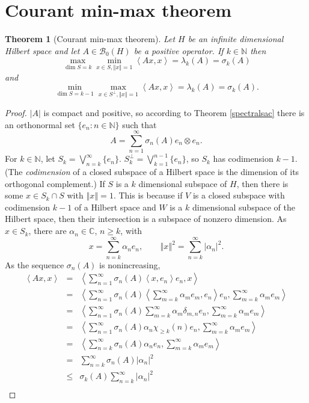 \documentclass{article}
\newcommand{\inner}[2]{\left\langle #1, #2 \right\rangle}
\newcommand{\norm}[1]{\left\Vert #1 \right\Vert}
\newtheorem{theorem}{Theorem}
\theoremstyle{definition}
\begin{document}
\section{Courant min-max theorem}
\begin{theorem}[Courant min-max theorem]
Let $H$ be an infinite dimensional Hilbert space and let $A \in \mathscr{B}_0(H)$ be a positive operator.
If $k \in \mathbb{N}$ then
\[
\max_{\dim S = k} \min_{x \in S, \norm{x}=1} \inner{Ax}{x}=\lambda_k(A)=\sigma_k(A)
\]
and
\[
\min_{\dim S=k-1} \max_{x \in S^\perp, \norm{x}=1} \inner{Ax}{x}=\lambda_k(A)=\sigma_k(A).
\]
\end{theorem}
\begin{proof}
 $|A|$ is compact and positive, so
according to Theorem \ref{spectralsac} there is an orthonormal set $\{e_n: n \in \mathbb{N}\}$ such that
\[
A=\sum_{n=1}^\infty \sigma_n(A) e_n \otimes e_n.
\]
For $k \in \mathbb{N}$,
 let $S_k=\bigvee_{n=k}^\infty \{e_n\}$. $S_k^\perp=\bigvee_{k=1}^{n-1} \{e_n\}$, so $S_k$ has codimension $k-1$. (The {\em codimension} of a closed subspace
of a Hilbert space is the dimension of its orthogonal complement.)
If $S$ is a
$k$ dimensional subspace of $H$,  then there is some $x \in S_k \cap S$ with $\norm{x}=1$. This is because if $V$ is a closed
subspace with codimension $k-1$ of a Hilbert space and $W$ is a  $k$ dimensional subspace of the Hilbert space, then their intersection is a subspace of nonzero dimension. 
As $x \in S_k$, there are $\alpha_n \in \mathbb{C}$, $n \geq k$, with
\[
x=\sum_{n=k}^\infty \alpha_n e_n, \qquad \norm{x}^2 =\sum_{n=k}^\infty |\alpha_n|^2.
\]
As the sequence $\sigma_n(A)$ is nonincreasing,
\begin{eqnarray*}
\inner{Ax}{x}&=&\inner{\sum_{n=1}^\infty \sigma_n(A) \inner{x}{e_n} e_n}{x}\\
&=&\inner{\sum_{n=1}^\infty \sigma_n(A) \inner{\sum_{m=k}^\infty \alpha_m e_m}{e_n} e_n}{\sum_{m=k}^\infty \alpha_m e_m}\\
&=&\inner{\sum_{n=1}^\infty \sigma_n(A) \sum_{m=k}^\infty \alpha_m \delta_{m,n} e_n}{\sum_{m=k}^\infty \alpha_m e_m}\\
&=&\inner{\sum_{n=1}^\infty \sigma_n(A) \alpha_n \chi_{\geq k}(n) e_n}{\sum_{m=k}^\infty \alpha_m e_m}\\
&=&\inner{\sum_{n=k}^\infty \sigma_n(A) \alpha_n  e_n}{\sum_{m=k}^\infty \alpha_m e_m}\\
&=&\sum_{n=k}^\infty \sigma_n(A) |\alpha_n|^2\\
&\leq&\sigma_k(A) \sum_{n=k}^\infty |\alpha_n|^2\\

\end{eqnarray*}
\end{proof}
\end{document}
